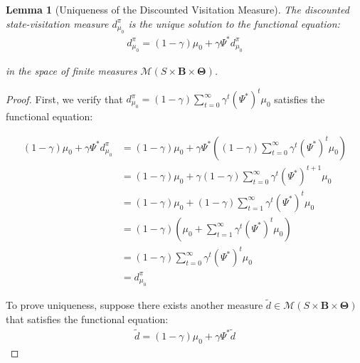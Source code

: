 \documentclass[a4paper,12pt]{report}
\newtheorem{lemma}{Lemma}
\begin{document}
\begin{lemma}[Uniqueness of the Discounted Visitation Measure]
    The discounted state-visitation measure $d^{\pi}_{\mu_0}$ is the unique solution
    to the functional equation:
    \begin{align}
        d^{\pi}_{\mu_0}= (1-\gamma)\mu_{0} + \gamma \Psi^{*} d^{\pi}_{\mu_0}
    \end{align}

    in the space of finite measures $\mathcal{M}(S \times \boldsymbol{B}\times \boldsymbol
        {\Theta})$.
\end{lemma}
\begin{proof}
    First, we verify that
    $d^{\pi}_{\mu_0}= (1-\gamma) \sum_{t=0}^{\infty}\gamma^{t} (\Psi^{*})^{t} \mu_{0}$
    satisfies the functional equation:

    \begin{align}
        (1-\gamma)\mu_{0} + \gamma \Psi^{*} d^{\pi}_{\mu_0} & = (1-\gamma)\mu_{0} + \gamma \Psi^{*} \left( (1-\gamma) \sum_{t=0}^{\infty}\gamma^{t} (\Psi^{*})^{t} \mu_{0} \right) \\
                                                            & = (1-\gamma)\mu_{0} + \gamma (1-\gamma) \sum_{t=0}^{\infty}\gamma^{t} (\Psi^{*})^{t+1}\mu_{0}                        \\
                                                            & = (1-\gamma)\mu_{0} + (1-\gamma) \sum_{t=1}^{\infty}\gamma^{t} (\Psi^{*})^{t} \mu_{0}                                \\
                                                            & = (1-\gamma) \left( \mu_{0} + \sum_{t=1}^{\infty}\gamma^{t} (\Psi^{*})^{t} \mu_{0} \right)                           \\
                                                            & = (1-\gamma) \sum_{t=0}^{\infty}\gamma^{t} (\Psi^{*})^{t} \mu_{0}                                                    \\
                                                            & = d^{\pi}_{\mu_0}
    \end{align}

    To prove uniqueness, suppose there exists another measure
    $\tilde{d}\in \mathcal{M}(S \times \boldsymbol{B}\times \boldsymbol{\Theta})$
    that satisfies the functional equation:
    \begin{align}
        \tilde{d}= (1-\gamma)\mu_{0} + \gamma \Psi^{*} \tilde{d}
    \end{align}


\end{proof}
\end{document}
